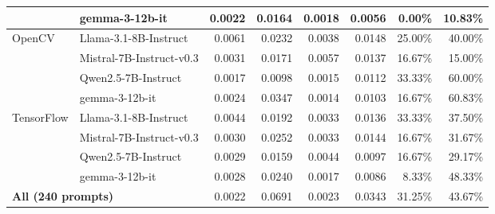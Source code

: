\begin{table}[t!]
\begin{tabular}{llrrrrrr}
 & gemma-3-12b-it & 0.0022 & 0.0164 & 0.0018 & 0.0056 & 0.00\% & 10.83\% \\
\midrule
\multirow{4}{*}{OpenCV} & Llama-3.1-8B-Instruct & 0.0061 & 0.0232 & 0.0038 & 0.0148 & 25.00\% & 40.00\% \\
 & Mistral-7B-Instruct-v0.3 & 0.0031 & 0.0171 & 0.0057 & 0.0137 & 16.67\% & 15.00\% \\
 & Qwen2.5-7B-Instruct & 0.0017 & 0.0098 & 0.0015 & 0.0112 & 33.33\% & 60.00\% \\
 & gemma-3-12b-it & 0.0024 & 0.0347 & 0.0014 & 0.0103 & 16.67\% & 60.83\% \\
\midrule
\multirow{4}{*}{TensorFlow} & Llama-3.1-8B-Instruct & 0.0044 & 0.0192 & 0.0033 & 0.0136 & 33.33\% & 37.50\% \\
 & Mistral-7B-Instruct-v0.3 & 0.0030 & 0.0252 & 0.0033 & 0.0144 & 16.67\% & 31.67\% \\
 & Qwen2.5-7B-Instruct & 0.0029 & 0.0159 & 0.0044 & 0.0097 & 16.67\% & 29.17\% \\
 & gemma-3-12b-it & 0.0028 & 0.0240 & 0.0017 & 0.0086 & 8.33\% & 48.33\% \\
\midrule
\multicolumn{2}{l}{\textbf{All (240 prompts)}} & 0.0022 & 0.0691 & 0.0023 & 0.0343 & 31.25\% & 43.67\% \\
        \bottomrule
    \end{tabular}
\end{table}
